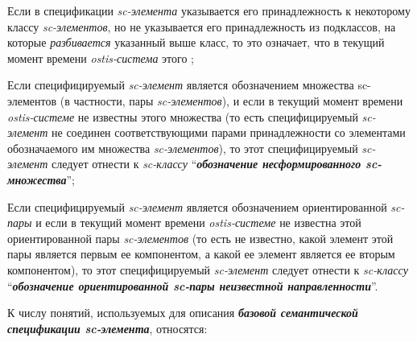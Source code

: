 \begin{textitemize}
	\item Если в спецификации \textit{sc-элемента} указывается его принадлежность к некоторому классу \textit{sc-элементов}, но не указывается его принадлежность  из подклассов, на которые \textit{разбивается} указанный выше класс, то это означает, что в текущий момент времени \textit{ostis-система} этого ;
	\item Если специфицируемый \textit{sc-элемент} является обозначением  множества sc-элементов (в частности, пары \textit{sc-элементов}), и если в текущий момент времени \textit{ostis-системе} не известны  этого множества (то есть специфицируемый \textit{sc-элемент} не соединен соответствующими парами принадлежности со  элементами обозначаемого им множества \textit{sc-элементов}), то этот специфицируемый \textit{sc-элемент} следует отнести к \textit{sc-классу} ``\textbf{\textit{обозначение несформированного sc-множества}}'';
	\item Если специфицируемый \textit{sc-элемент} является обозначением ориентированной \textit{sc-пары} и если в текущий момент времени \textit{ostis-системе} не известна  этой ориентированной пары \textit{sc-элементов} (то есть не известно, какой элемент этой пары является первым ее компонентом, а какой ее элемент является ее вторым компонентом), то этот специфицируемый \textit{sc-элемент} следует отнести к \textit{sc-классу} ``\textbf{\textit{обозначение ориентированной sc-пары неизвестной направленности}}''.
\end{textitemize}

К числу понятий, используемых для описания  \textbf{\textit{базовой семантической спецификации sc-элемента}}, относятся:

